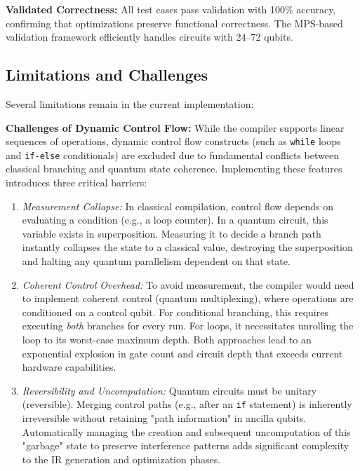 \documentclass[a4paper,twocolumn]{article}
\begin{document}
\textbf{Validated Correctness:} All test cases pass validation with 100\% accuracy, confirming that
optimizations preserve functional correctness. The MPS-based validation framework efficiently handles
circuits with 24--72 qubits.

\subsection{Limitations and Challenges}

Several limitations remain in the current implementation:

\textbf{Challenges of Dynamic Control Flow:} While the compiler supports linear sequences of operations,
dynamic control flow constructs (such as \texttt{while} loops and \texttt{if-else} conditionals)
are excluded due to fundamental conflicts between classical branching and quantum state coherence. Implementing
these features introduces three critical barriers:

\begin{enumerate}
  \item \textit{Measurement Collapse:} In classical compilation, control flow depends on evaluating a
        condition (e.g., a loop counter). In a quantum circuit, this variable exists in superposition. Measuring
        it to decide a branch path instantly collapses the state to a classical value, destroying the superposition
        and halting any quantum parallelism dependent on that state.

  \item \textit{Coherent Control Overhead:} To avoid measurement, the compiler would need to implement
        coherent control (quantum multiplexing), where operations are conditioned on a control qubit.
        For conditional branching, this requires executing \textit{both} branches for every run. For loops, it
        necessitates unrolling the loop to its worst-case maximum depth. Both approaches lead to an exponential
        explosion in gate count and circuit depth that exceeds current hardware capabilities.

  \item \textit{Reversibility and Uncomputation:} Quantum circuits must be unitary (reversible).
        Merging control paths (e.g., after an \texttt{if} statement) is inherently irreversible without
        retaining "path information" in ancilla qubits. Automatically managing the creation and subsequent
        uncomputation of this "garbage" state to preserve interference patterns adds significant complexity to the
        IR generation and optimization phases.
\end{enumerate}
\end{document}
